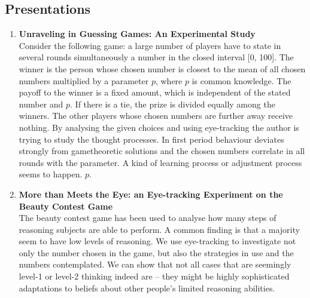 \subsection{Presentations}
	\begin{enumerate}[label=\alph*\upshape)]
		\item \textbf{Unraveling in Guessing Games: An Experimental Study} \\ 
			Consider the following game: a large number of players have to state in several rounds simultaneously a number in the closed interval [0, 100]. The winner is the person whose chosen number is closest to the mean of all chosen numbers multiplied by a parameter $p$, where $p$ is common knowledge. The payoff to the winner is a fixed amount, which is independent of the stated number and $p$. If there is a tie, the prize is divided equally among the winners. The other players whose chosen numbers are further away receive nothing. By analysing the given choices and using eye-tracking the author is trying to study the thought processes. In first period behaviour deviates strongly from gametheoretic solutions and the chosen numbers correlate in all rounds with the parameter. A kind of learning process or adjustment process seems to happen. $p$. 
		\item \textbf{More than Meets the Eye: an Eye-tracking Experiment on the Beauty Contest Game}  \\
			The beauty contest game has been used to analyse how many steps of reasoning subjects are able to perform. A common finding is that a majority seem to have low levels of reasoning. We use eye-tracking to investigate not only the number chosen in the game, but also the strategies in use and the numbers contemplated. We can show that not all cases that are seemingly level-1 or level-2 thinking indeed are – they might be highly sophisticated adaptations to beliefs about other people’s limited reasoning abilities.
	\end{enumerate}

\newpage